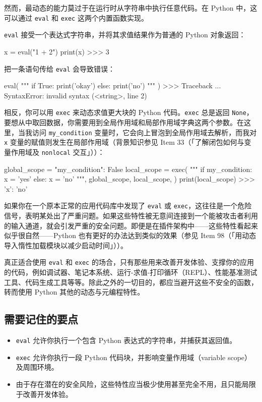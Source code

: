 然而，最动态的能力莫过于在运行时从字符串中执行任意代码。在 Python 中，这可以通过 \texttt{eval} 和 \texttt{exec} 这两个内置函数实现。

\texttt{eval} 接受一个表达式字符串，并将其求值结果作为普通的 Python 对象返回：

\begin{codebox}[python]
x = eval("1 + 2")
print(x)
>>>
3
\end{codebox}

把一条语句传给 \texttt{eval} 会导致错误：

\begin{codebox}[python]
eval(
    """
if True:
    print('okay')
else:
    print('no')
"""
)
>>>
Traceback ...
SyntaxError: invalid syntax (<string>, line 2)
\end{codebox}

相反，你可以用 \texttt{exec} 来动态求值更大块的 Python 代码。\texttt{exec} 总是返回 \texttt{None}，要想从中取回数据，你需要用到全局作用域和局部作用域字典这两个参数。在这里，当我访问 \texttt{my\_condition} 变量时，它会向上冒泡到全局作用域去解析，而我对 \texttt{x} 变量的赋值则发生在局部作用域（背景知识参见 Item 33（「了解闭包如何与变量作用域及 \texttt{nonlocal} 交互」））：

\begin{codebox}[python]
global_scope = {"my_condition": False}
local_scope = {}
exec(
    """
if my_condition:
    x = 'yes'
else:
    x = 'no'
""",
    global_scope,
    local_scope,
)
print(local_scope)
>>>
{'x': 'no'}
\end{codebox}

如果你在一个原本正常的应用代码库中发现了 \texttt{eval} 或 \texttt{exec}，这往往是一个危险信号，表明某处出了严重问题。如果这些特性被无意间连接到一个能被攻击者利用的输入通道，就会引发严重的安全问题。即便是在插件架构中——这些特性看起来似乎很自然——Python 也有更好的办法达到类似的效果（参见 Item 98（「用动态导入惰性加载模块以减少启动时间」））。

真正适合使用 \texttt{eval} 和 \texttt{exec} 的场合，只有那些用来改善开发体验、支撑你的应用的代码，例如调试器、笔记本系统、运行-求值-打印循环（REPL）、性能基准测试工具、代码生成工具等等。除此之外的一切目的，都应当避开这些不安全的函数，转而使用 Python 其他的动态与元编程特性。

\subsection{需要记住的要点}

\begin{itemize}
\item \texttt{eval} 允许你执行一个包含 Python 表达式的字符串，并捕获其返回值。
\item \texttt{exec} 允许你执行一段 Python 代码块，并影响变量作用域（variable scope）及周围环境。
\item 由于存在潜在的安全风险，这些特性应当极少使用甚至完全不用，且只能局限于改善开发体验。
\end{itemize}
